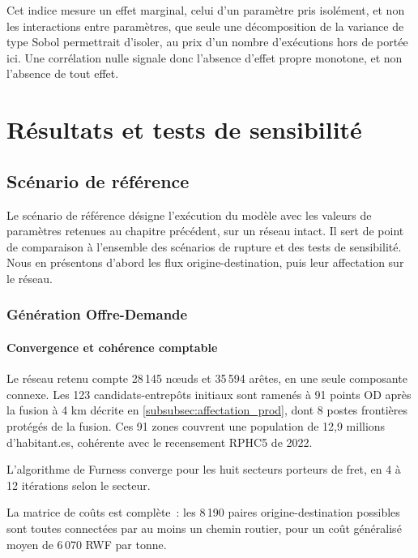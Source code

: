 \documentclass[12pt,a4paper,french]{report}
\begin{document}
	Cet indice mesure un effet marginal, celui d'un paramètre pris isolément, et non les interactions entre paramètres, que seule une décomposition de la variance de type Sobol permettrait d'isoler, au prix d'un nombre d'exécutions hors de portée ici. Une corrélation nulle signale donc l'absence d'effet propre monotone, et non l'absence de tout effet.
	
	
	\newpage
	
	\chapter{Résultats et tests de sensibilité}
	
	\section{Scénario de référence}
	\label{sec:ref}
	
	Le scénario de référence désigne l'exécution du modèle avec les valeurs de paramètres retenues au chapitre précédent, sur un réseau intact. Il sert de point de comparaison à l'ensemble des scénarios de rupture et des tests de sensibilité. Nous en présentons d'abord les flux origine-destination, puis leur affectation sur le réseau.

	\subsection{Génération Offre-Demande}
	\label{subsec:OD}

	\subsubsection{Convergence et cohérence comptable}

	Le réseau retenu compte 28\,145 nœuds et 35\,594 arêtes, en une seule composante connexe. Les 123 candidats-entrepôts initiaux sont ramenés à 91 points OD après la fusion à 4 km décrite en \ref{subsubsec:affectation_prod}, dont 8 postes frontières protégés de la fusion. Ces 91 zones couvrent une population de 12,9 millions d'habitant.es, cohérente avec le recensement RPHC5 de 2022.

	L'algorithme de Furness converge pour les huit secteurs porteurs de fret, en 4 à 12 itérations selon le secteur.

	La matrice de coûts est complète~: les 8\,190 paires origine-destination possibles sont toutes connectées par au moins un chemin routier, pour un coût généralisé moyen de 6\,070 RWF par tonne.
\end{document}
